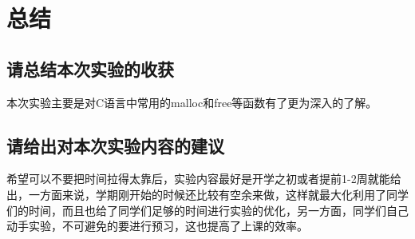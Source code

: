 \section{总结}

\subsection{请总结本次实验的收获}
本次实验主要是对C语言中常用的malloc和free等函数有了更为深入的了解。

\subsection{请给出对本次实验内容的建议}
希望可以不要把时间拉得太靠后，实验内容最好是开学之初或者提前1-2周就能给出，一方面来说，学期刚开始的时候还比较有空余来做，这样就最大化利用了同学们的时间，而且也给了同学们足够的时间进行实验的优化，另一方面，同学们自己动手实验，不可避免的要进行预习，这也提高了上课的效率。